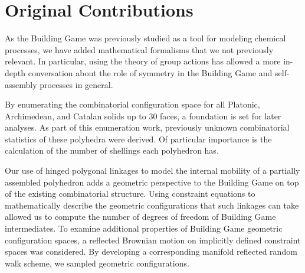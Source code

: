 %
%
%
\section{Original Contributions}


As the Building Game was previously studied as a tool for modeling chemical processes, we have added mathematical formalisms that we not previously relevant. In particular, using the theory of group actions has allowed a more in-depth conversation about the role of symmetry in the Building Game and self-assembly processes in general.

By enumerating the combinatorial configuration space for all Platonic, Archimedean, and Catalan solids up to 30 faces, a foundation is set for later analyses. As part of this enumeration work, previously unknown combinatorial statistics of these polyhedra were derived. Of particular importance is the calculation of the number of shellings each polyhedron has.  

Our use of hinged polygonal linkages to model the internal mobility of a partially assembled polyhedron adds a geometric perspective to the Building Game on top of the existing combinatorial structure. Using constraint equations to mathematically describe the geometric configurations that such linkages can take allowed us to compute the number of degrees of freedom of Building Game intermediates. To examine additional properties of Building Game geometric configuration spaces, a reflected Brownian motion on implicitly defined constraint spaces was considered. By developing a corresponding manifold reflected random walk scheme, we sampled geometric configurations.



